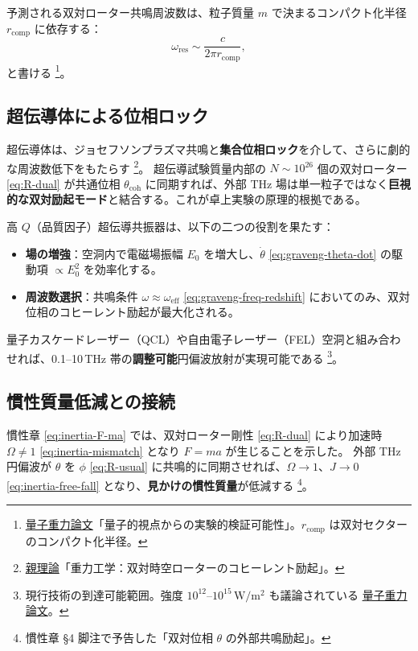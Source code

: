 \documentclass[dvipdfmx,a4paper,oneside]{jsbook}
\numberwithin{equation}{chapter}
\begin{document}
予測される双対ローター共鳴周波数は、粒子質量 \(m\) で決まるコンパクト化半径 \(r_{\mathrm{comp}}\) に依存する：
\begin{equation}
  \omega_{\mathrm{res}} \sim \frac{c}{2\pi r_{\mathrm{comp}}},
  \label{eq:graveng-resonance-freq}
\end{equation}
と書ける \footnote{\hyperref[sec:sister-manuscripts]{量子重力論文}「量子的視点からの実験的検証可能性」。\(r_{\mathrm{comp}}\) は双対セクターのコンパクト化半径。}。

\subsection{超伝導体による位相ロック}

超伝導体は、ジョセフソンプラズマ共鳴と\textbf{集合位相ロック}を介して、さらに劇的な周波数低下をもたらす \footnote{\hyperref[sec:sister-manuscripts]{親理論}「重力工学：双対時空ローターのコヒーレント励起」。}。
超伝導試験質量内部の \(N \sim 10^{26}\) 個の双対ローター \eqref{eq:R-dual} が共通位相 \(\theta_{\mathrm{coh}}\) に同期すれば、外部 THz 場は単一粒子ではなく\textbf{巨視的な双対励起モード}と結合する。これが卓上実験の原理的根拠である。

高 \(Q\)（品質因子）超伝導共振器は、以下の二つの役割を果たす：
\begin{itemize}[leftmargin=2em]
  \item \textbf{場の増強}：空洞内で電磁場振幅 \(E_0\) を増大し、\(\dot{\theta}\) \eqref{eq:graveng-theta-dot} の駆動項 \(\propto E_0^2\) を効率化する。
  \item \textbf{周波数選択}：共鳴条件 \(\omega \approx \omega_{\mathrm{eff}}\) \eqref{eq:graveng-freq-redshift} においてのみ、双対位相のコヒーレント励起が最大化される。
\end{itemize}

量子カスケードレーザー（QCL）や自由電子レーザー（FEL）空洞と組み合わせれば、0.1--10\,THz 帯の\textbf{調整可能}円偏波放射が実現可能である \footnote{現行技術の到達可能範囲。強度 \(10^{12}\)–\(10^{15}\,\mathrm{W/m^2}\) も議論されている \hyperref[sec:sister-manuscripts]{量子重力論文}。}。

\subsection{慣性質量低減との接続}

慣性章 \eqref{eq:inertia-F-ma} では、双対ローター剛性 \eqref{eq:R-dual} により加速時 \(\Omega \neq 1\) \eqref{eq:inertia-mismatch} となり \(F = ma\) が生じることを示した。
外部 THz 円偏波が \(\theta\) を \(\phi\) \eqref{eq:R-usual} に共鳴的に同期させれば、\(\Omega \to 1\)、\(J \to 0\) \eqref{eq:inertia-free-fall} となり、\textbf{見かけの慣性質量}が低減する \footnote{慣性章 §4 脚注で予告した「双対位相 \(\theta\) の外部共鳴励起」。}。
\end{document}
